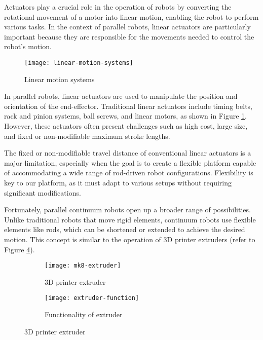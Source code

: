 Actuators play a crucial role in the operation of robots by converting the rotational movement of a motor into linear motion, enabling the robot to perform various tasks. In the context of parallel robots, linear actuators are particularly important because they are responsible for the movements needed to control the robot's motion.

\begin{figure}[H]
    \centering
    \texttt{[image: linear-motion-systems]}
    \caption{Linear motion systems}
    \label{fig:linear-motion-systems}
\end{figure}

In parallel robots, linear actuators are used to manipulate the position and orientation of the end-effector. Traditional linear actuators include timing belts, rack and pinion systems, ball screws, and linear motors, as shown in Figure \ref{fig:linear-motion-systems}. However, these actuators often present challenges such as high cost, large size, and fixed or non-modifiable maximum stroke lengths.

The fixed or non-modifiable travel distance of conventional linear actuators is a major limitation, especially when the goal is to create a flexible platform capable of accommodating a wide range of rod-driven robot configurations. Flexibility is key to our platform, as it must adapt to various setups without requiring significant modifications.

Fortunately, parallel continuum robots open up a broader range of possibilities. Unlike traditional robots that move rigid elements, continuum robots use flexible elements like rods, which can be shortened or extended to achieve the desired motion. This concept is similar to the operation of 3D printer extruders (refer to Figure \ref{fig:extruder}).

\begin{figure}[H]
    \centering
    \begin{subfigure}[b]{0.4\textwidth}
        \texttt{[image: mk8-extruder]}
        \caption{3D printer extruder}
        \label{fig:mk8-extruder}
    \end{subfigure}
    \begin{subfigure}[b]{0.4\textwidth}
        \texttt{[image: extruder-function]}
        \caption{Functionality of extruder}
        \label{fig:extruder-function}
    \end{subfigure}
    \caption{3D printer extruder}
    \label{fig:extruder}
\end{figure}

